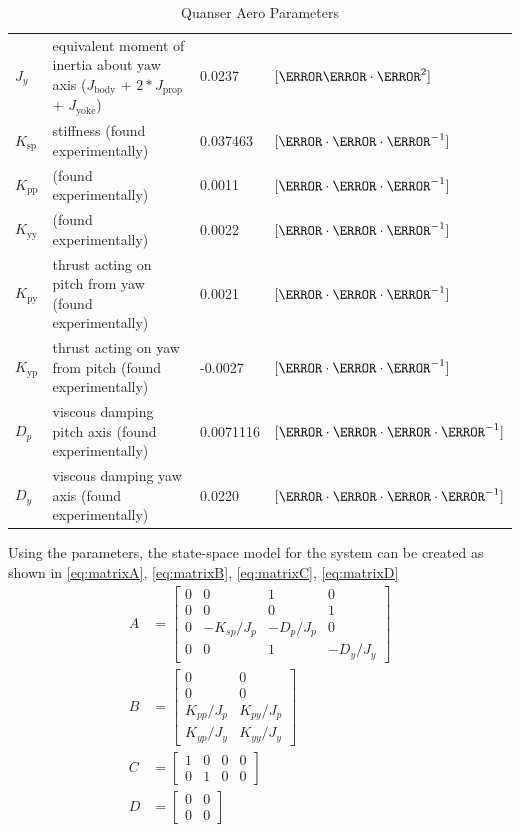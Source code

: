 \documentclass[letterpaper, 10pt, conference]{ieeeconf}
\begin{document}
\begin{table}
\begin{tabular}{l|l|l|l}
        $J_y$ & equivalent moment of inertia about yaw axis ($J_{\text{body}}$ + $2*J_{\text{prop}}$ + $J_{\text{yoke}}$) & 0.0237 & $[\kilo\gram\cdot\meter^2]$ \\
        $K_{\text{sp}}$ & stiffness (found experimentally) & 0.037463 & $[\newton\cdot\meter\cdot\radian^{-1}]$ \\
        $K_{\text{pp}}$ & (found experimentally) & 0.0011 & $[\newton\cdot\meter\cdot\volt^{-1}]$ \\
        $K_{\text{yy}}$ & (found experimentally) & 0.0022 & $[\newton\cdot\meter\cdot\volt^{-1}]$ \\
        $K_{\text{py}}$ & thrust acting on pitch from yaw (found experimentally) & 0.0021 & $[\newton\cdot\meter\cdot\volt^{-1}]$ \\
        $K_{\text{yp}}$ & thrust acting on yaw from pitch (found experimentally) & -0.0027 & $[\newton\cdot\meter\cdot\volt^{-1}]$ \\
        $D_p$ & viscous damping pitch axis (found experimentally) & 0.0071116 & $[\newton\cdot\meter\cdot\second\cdot\radian^{-1}]$ \\
        $D_y$ & viscous damping yaw axis (found experimentally) & 0.0220 & $[\newton\cdot\meter\cdot\second\cdot\radian^{-1}]$\\
        \bottomrule
    \end{tabular}
    \caption{Quanser Aero Parameters}
    \label{tab:aeroparameters}
\end{table}
%
Using the parameters, the state-space model for the system can be created as shown in \autoref{eq:matrixA}, \autoref{eq:matrixB}, \autoref{eq:matrixC}, \autoref{eq:matrixD}\;
%
\begin{align}
\label{eq:matrixA}
A &= 
\begin{bmatrix}
    0 & 0 & 1 & 0 \\
    0 & 0 & 0 & 1 \\
    0 & -K_{sp}/J_p & -D_p/J_p & 0 \\
    0 & 0 & 1 & -D_y/J_y 
\end{bmatrix}    
\\
\label{eq:matrixB}
B &= 
\begin{bmatrix}
    0 & 0 \\
    0 & 0 \\
    K_{pp}/J_p & K_{py}/J_p \\
    K_{yp}/J_y & K_{yy}/J_y 
\end{bmatrix}
\\
\label{eq:matrixC}
C &= 
\begin{bmatrix}
    1 & 0 & 0 & 0 \\
    0 & 1 & 0 & 0
\end{bmatrix}
\\
\label{eq:matrixD}
D &= 
\begin{bmatrix}
    0 & 0 \\
    0 & 0
\end{bmatrix}
\end{align}
\end{document}
